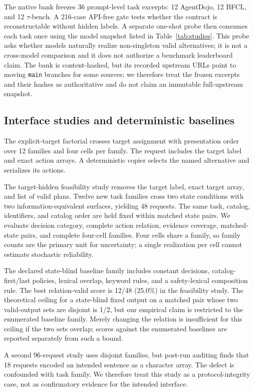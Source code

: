 The native bank freezes 36 prompt-level task excerpts: 12 AgentDojo, 12 BFCL, and 12 $\tau$-bench. A 216-case API-free gate tests whether the contract is reconstructable without hidden labels. A separate one-shot probe then consumes each task once using the model snapshot listed in Table~\ref{tab:studies}. This probe asks whether models naturally realize non-singleton valid alternatives; it is not a cross-model comparison and it does not authorize a benchmark leaderboard claim. The bank is content-hashed, but its recorded upstream URLs point to moving \texttt{main} branches for some sources; we therefore treat the frozen excerpts and their hashes as authoritative and do not claim an immutable full-upstream snapshot.

\subsection{Interface studies and deterministic baselines}
The explicit-target factorial crosses target assignment with presentation order over 12 families and four cells per family. The request includes the target label and exact action arrays. A deterministic copier selects the named alternative and serializes its actions.

The target-hidden feasibility study removes the target label, exact target array, and list of valid plans. Twelve new task families cross two state conditions with two information-equivalent surfaces, yielding 48 requests. The same task, catalog, identifiers, and catalog order are held fixed within matched state pairs. We evaluate decision category, complete action relation, evidence coverage, matched-state pairs, and complete four-cell families. Four cells share a family, so family counts are the primary unit for uncertainty; a single realization per cell cannot estimate stochastic reliability.

The declared state-blind baseline family includes constant decisions, catalog-first/last policies, lexical overlap, keyword rules, and a safety-lexical composition rule. The best relation-valid score is 12/48 (25.0\%) in the feasibility study. The theoretical ceiling for a state-blind fixed output on a matched pair whose two valid-output sets are disjoint is 1/2, but our empirical claim is restricted to the enumerated baseline family. Merely changing the relation is insufficient for this ceiling if the two sets overlap; scores against the enumerated baselines are reported separately from such a bound.

A second 96-request study uses disjoint families, but post-run auditing finds that 18 requests encoded an intended sentence as a character array. The defect is confounded with task family. We therefore treat this study as a protocol-integrity case, not as confirmatory evidence for the intended interface.

